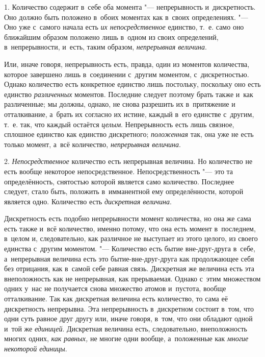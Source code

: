 
1. Количество содержит в~себе оба момента "--- непрерывность и~дискретность.
Оно должно быть положено в~обоих моментах как в~своих определениях. "--- Оно
уже с~самого начала есть {\em их непосредственное} единство, т.~е. само оно
ближайшим образом положено лишь в~одном из своих определений, в~непрерывности,
и~есть, таким образом, {\em непрерывная величина}.

Или, иначе говоря, непрерывность есть, правда, один из моментов количества,
которое завершено лишь в~соединении с~другим моментом, с~дискретностью. Однако
количество есть конкретное единство лишь постольку, поскольку оно есть единство
{\em различенных} моментов. Последние следует поэтому брать также и~как
различенные; мы должны, однако, не снова разрешить их в~притяжение и
отталкивание, а~брать их согласно их истине, каждый в~его единстве с~другим,
т.~е. так, что каждый остаётся {\em целым}. Непрерывность есть лишь связное,
сплошное единство как единство дискретного; {\em положенная} так, она уже не
есть только момент, а~всё количество, {\em непрерывная величина}.

2. {\em Непосредственное} количество есть непрерывная величина. Но количество
не есть вообще некоторое непосредственное. Непосредственность "--- это та
определённость, снятостью которой является само количество. Последнее следует,
стало быть, положить в~имманентной ему определённости, которой является одно.
Количество есть {\em дискретная величина}.

Дискретность есть подобно непрерывности момент количества, но она же сама есть
также и~всё количество, именно потому, что она есть момент в~последнем, в~целом
и, следовательно, как различное не выступает из этого целого, из своего
единства с~другим моментом. "--- Количество есть бытие вне-друг-друга в~себе,
а~непрерывная величина есть это бытие-вне-друг-друга как продолжающее себя без
отрицания, как в~самой себе равная связь. Дискретная же величина есть эта
внеположность как не непрерывная, как прерываемая. Однако с~этим множеством
одних у~нас не получается снова множество атомов и~пустота, вообще
отталкивание. Так как дискретная величина есть количество, то сама её
дискретность непрерывна. Эта непрерывность в~дискретном состоит в~том, что одни
суть равное друг другу или, иначе говоря, в~том, что они обладают одной и~той
же {\em единицей}. Дискретная величина есть, следовательно, внеположность
многих одних, {\em как равных,} не многие одни вообще, а~положенные как
{\em многие некоторой единицы}.

